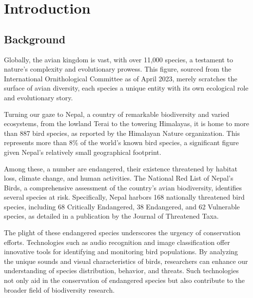 \chapter{Introduction}
\section{Background}\label{sec:bkgrnd}%
Globally, the avian kingdom is vast, with over 11,000 species, a testament to nature's complexity and evolutionary prowess. This figure, sourced from the International Ornithological Committee as of April 2023, merely scratches the surface of avian diversity, each species a unique entity with its own ecological role and evolutionary story.\cite{ioc_updates}

Turning our gaze to Nepal, a country of remarkable biodiversity and varied ecosystems, from the lowland Terai to the towering Himalayas, it is home to more than 887 bird species, as reported by the Himalayan Nature organization. This represents more than 8\% of the world's known bird species, a significant figure given Nepal's relatively small geographical footprint.\cite{himalayan}

Among these, a number are endangered, their existence threatened by habitat loss, climate change, and human activities. The National Red List of Nepal's Birds, a comprehensive assessment of the country's avian biodiversity, identifies several species at risk. Specifically, Nepal harbors 168 nationally threatened bird species, including 68 Critically Endangered, 38 Endangered, and 62 Vulnerable species, as detailed in a publication by the Journal of Threatened Taxa.\cite{inskipp2017nepala}

The plight of these endangered species underscores the urgency of conservation efforts. Technologies such as audio recognition and image classification offer innovative tools for identifying and monitoring bird populations. By analyzing the unique sounds and visual characteristics of birds, researchers can enhance our understanding of species distribution, behavior, and threats. Such technologies not only aid in the conservation of endangered species but also contribute to the broader field of biodiversity research.

  
